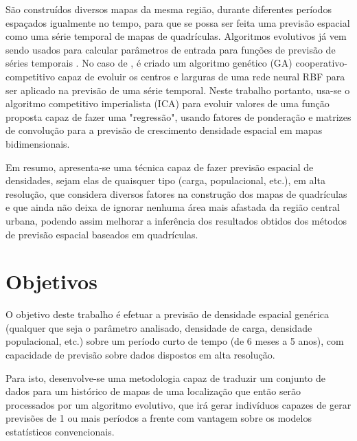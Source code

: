 São construídos diversos mapas da mesma região, durante diferentes períodos espaçados igualmente no tempo, para que se possa ser feita uma previsão espacial como uma série temporal de mapas de quadrículas. Algoritmos evolutivos já vem sendo usados para calcular parâmetros de entrada para funções de previsão de séries temporais \cite{whitehead1996cooperative}. No caso de \citeauthor{whitehead1996cooperative}, é criado um algoritmo genético (GA) \cite{mitchell1998introduction} cooperativo-competitivo capaz de evoluir os centros e larguras de uma rede neural RBF \cite{ren2006rbfnn} para ser aplicado na previsão de uma série temporal. Neste trabalho portanto, usa-se o algoritmo competitivo imperialista (ICA) para evoluir valores de uma função proposta capaz de fazer uma "regressão", usando fatores de ponderação e matrizes de convolução para a previsão de crescimento densidade espacial em mapas bidimensionais.

Em resumo, apresenta-se uma técnica capaz de fazer previsão espacial de densidades, sejam elas de quaisquer tipo (carga, populacional, etc.), em alta resolução, que considera diversos fatores na construção dos mapas de quadrículas e que ainda não deixa de ignorar nenhuma área mais afastada da região central urbana, podendo assim melhorar a inferência dos resultados obtidos dos métodos de previsão espacial baseados em quadrículas. 

\section{Objetivos}

O objetivo deste trabalho é efetuar a previsão de densidade espacial genérica (qualquer que seja o parâmetro analisado, densidade de carga, densidade populacional, etc.) sobre um período curto de tempo (de 6 meses a 5 anos), com capacidade de previsão sobre dados dispostos em alta resolução.

Para isto, desenvolve-se uma metodologia capaz de traduzir um conjunto de dados para um histórico de mapas de uma localização que então serão processados por um algoritmo evolutivo, que irá gerar indivíduos capazes de gerar previsões de 1 ou mais períodos a frente com vantagem sobre os modelos estatísticos convencionais. 

